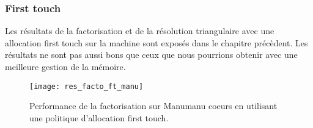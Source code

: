 \subsubsection{First touch}




Les résultats de la factorisation et de la résolution triangulaire avec une allocation first touch sur la machine  sont exposés dans le chapitre précèdent.
%
Les résultats ne sont pas aussi bons que ceux que nous pourrions obtenir avec une meilleure gestion de la mémoire.
%


\begin{figure}[t!]
  \centering
  \texttt{[image: res\_facto\_ft\_manu]}
  \caption{Performance de la factorisation sur Manumanu coeurs en utilisant une politique d'allocation first touch.}
  \label{fig:res_facto_ft_manumanu}
\end{figure}
